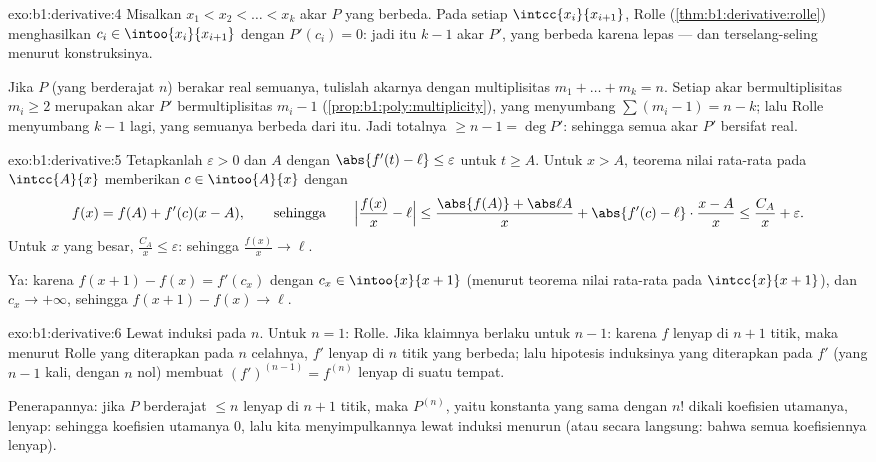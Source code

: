 \begin{solution}{exo:b1:derivative:4}
Misalkan $x_1 < x_2 < \dots < x_k$ akar $P$ yang berbeda. Pada setiap
$\intcc{x_i}{x_{i+1}}$, Rolle (\cref{thm:b1:derivative:rolle})
menghasilkan $c_i \in \intoo{x_i}{x_{i+1}}$ dengan $P'(c_i) = 0$: jadi itu
$k - 1$ akar $P'$, yang berbeda karena  
lepas --- dan terselang-seling menurut konstruksinya.

Jika $P$ (yang berderajat $n$) berakar real semuanya, tulislah akarnya dengan
multiplisitas $m_1 + \dots + m_k = n$. Setiap akar bermultiplisitas
$m_i \geq 2$ merupakan akar $P'$ bermultiplisitas $m_i - 1$
(\cref{prop:b1:poly:multiplicity}), yang menyumbang $\sum (m_i - 1) = n
- k$; lalu Rolle menyumbang $k - 1$ lagi, yang semuanya berbeda dari itu. Jadi totalnya
$\geq n - 1 = \deg P'$: sehingga semua akar $P'$ bersifat real.
\end{solution}

\begin{solution}{exo:b1:derivative:5}
Tetapkanlah $\varepsilon > 0$ dan $A$ dengan $\abs{f'(t) - \ell} \leq
\varepsilon$ untuk $t \geq A$. Untuk $x > A$, teorema nilai rata-rata pada
$\intcc{A}{x}$ memberikan $c \in \intoo{A}{x}$ dengan
\[
f(x) = f(A) + f'(c)(x - A),
\qquad\text{sehingga}\qquad
\Bigl|\frac{f(x)}{x} - \ell\Bigr|
\leq \frac{\abs{f(A)} + \abs\ell A}{x} + \abs{f'(c) - \ell}
\cdot\frac{x - A}{x} \leq \frac{C_A}{x} + \varepsilon .
\]
Untuk $x$ yang besar, $\frac{C_A}{x} \leq \varepsilon$: sehingga
$\frac{f(x)}{x} \to \ell$.

Ya: karena $f(x+1) - f(x) = f'(c_x)$ dengan $c_x \in \intoo{x}{x+1}$ (menurut teorema
nilai rata-rata pada $\intcc{x}{x+1}$), dan $c_x \to +\infty$, sehingga
$f(x+1) - f(x) \to \ell$.
\end{solution}

\begin{solution}{exo:b1:derivative:6}
Lewat induksi pada $n$. Untuk $n = 1$: Rolle. Jika klaimnya berlaku untuk $n - 1$:
karena $f$ lenyap di $n+1$ titik, maka menurut Rolle yang diterapkan pada $n$ celahnya,
$f'$ lenyap di $n$ titik yang berbeda; lalu hipotesis induksinya
yang diterapkan pada $f'$ (yang  $n-1$ kali, dengan $n$ nol) membuat
$(f')^{(n-1)} = f^{(n)}$ lenyap di suatu tempat.

Penerapannya: jika $P$ berderajat $\leq n$ lenyap di $n+1$ titik, maka
$P^{(n)}$, yaitu konstanta yang sama dengan $n!$ dikali koefisien utamanya,
lenyap: sehingga koefisien utamanya $0$, lalu kita menyimpulkannya lewat
induksi menurun (atau secara langsung: bahwa semua koefisiennya lenyap).
\end{solution}

